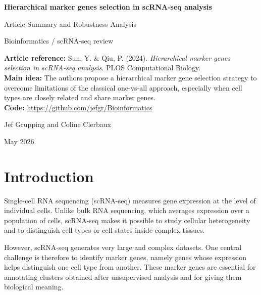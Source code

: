 \documentclass[11pt,a4paper]{article}
\begin{document}
\begin{titlepage}
    \centering
    \vspace*{2cm}
    {\Huge\bfseries\color{titleblue} Hierarchical marker genes selection in scRNA-seq analysis\par}
    \vspace{0.4cm}
    {\LARGE Article Summary and Robustness Analysis\par}
    \vspace{1cm}
    {\large Bioinformatics / scRNA-seq review\par}
    \vspace{1.5cm}

    \begin{minipage}{0.9\textwidth}
    \centering
    \setlength{\fboxsep}{12pt}
    \colorbox{softgray}{
        \parbox{0.85\textwidth}{
        \textbf{Article reference:} Sun, Y. \& Qiu, P. (2024). \textit{Hierarchical marker genes selection in scRNA-seq analysis}. PLOS Computational Biology.\\[0.2cm]
        \textbf{Main idea:} The authors propose a hierarchical marker gene selection strategy to overcome limitations of the classical one-vs-all approach, especially when cell types are closely related and share marker genes.\\[0.2cm]
        \textbf{Code:} \url{https://github.com/jefgr/Bioinformatics}
        }
    }
    \end{minipage}

    \vfill
    {\large Jef Grupping and Coline Clerbaux \par}
    \vspace{0.4cm}
    {\large May 2026 \par}
    \vfill
\end{titlepage}

\tableofcontents
\newpage

\section{Introduction}

Single-cell RNA sequencing (scRNA-seq) measures gene expression at the level of individual cells. Unlike bulk RNA sequencing, which averages expression over a population of cells, scRNA-seq makes it possible to study cellular heterogeneity and to distinguish cell types or cell states inside complex tissues.

However, scRNA-seq generates very large and complex datasets. One central challenge is therefore to identify marker genes, namely genes whose expression helps distinguish one cell type from another.
These marker genes are essential for annotating clusters obtained after unsupervised analysis and for giving them biological meaning.
\end{document}
